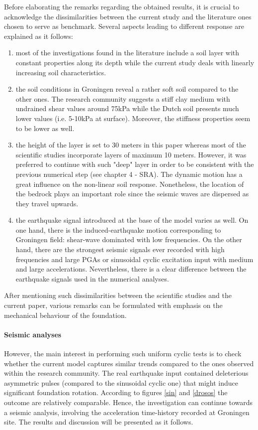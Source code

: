 \newpage
Before elaborating the remarks regarding the obtained results, it is crucial to acknowledge the dissimilarities between the current study and the literature ones chosen to serve as benchmark. Several aspects leading to different response are explained as it follows:
\begin{enumerate}
	\item most of the investigations found in the literature include a soil layer with constant \mbox{properties} along its depth while the current study deals with linearly increasing soil characteristics.
	\item the soil conditions in Groningen reveal a rather soft soil compared to the other ones. The research community suggests a stiff clay medium with undrained shear values around 75kPa while the Dutch soil presents much lower values (i.e. 5-10kPa at surface). Moreover, the stiffness properties seem to be lower as well.
	\item the height of the layer is set to 30 meters in this paper whereas most of the scientific studies incorporate layers of maximum 10 meters. However, it was preferred to continue with such "deep" layer in order to be consistent with the previous numerical step (see chapter 4 - SRA). The dynamic motion has a great influence on the non-linear soil response. Nonetheless, the location of the bedrock plays an important role since the seismic waves are dispersed as they travel upwards.
	\item the earthquake signal introduced at the base of the model varies as well. On one hand, there is the induced-earthquake motion corresponding to Groningen field: shear-wave dominated with low frequencies. On the other hand, there are the strongest seismic signals ever recorded with high frequencies and large PGAs or sinusoidal cyclic excitation input with medium and large accelerations. Nevertheless, there is a clear difference between the earthquake signals used in the numerical analyses. 
\end{enumerate}

After mentioning such dissimilarities between the scientific studies and the current paper, various remarks can be formulated with emphasis on the mechanical behaviour of the foundation. 


 
 \paragraph{Seismic analyses}
 However, the main interest in performing such uniform cyclic tests is to check whether the current model captures similar trends compared to the ones observed within the research community. The real earthquake input contained deleterious asymmetric pulses (compared to the sinusoidal cyclic one) that might induce significant foundation rotation. According to figures \ref{sin} and \ref{drosos} the outcome are relatively comparable. Hence, the investigation can continue towards a seismic analysis, involving the acceleration time-history recorded at Groningen site. The results and discussion will be presented as it follows.
 
